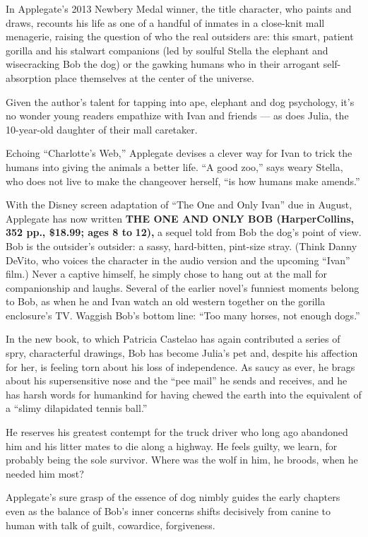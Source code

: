 In Applegate's 2013 Newbery Medal winner, the title character, who
paints and draws, recounts his life as one of a handful of inmates in a
close-knit mall menagerie, raising the question of who the real
outsiders are: this smart, patient gorilla and his stalwart companions
(led by soulful Stella the elephant and wisecracking Bob the dog) or the
gawking humans who in their arrogant self-absorption place themselves at
the center of the universe.

Given the author's talent for tapping into ape, elephant and dog
psychology, it's no wonder young readers empathize with Ivan and friends
--- as does Julia, the 10-year-old daughter of their mall caretaker.

Echoing ``Charlotte's Web,'' Applegate devises a clever way for Ivan to
trick the humans into giving the animals a better life. ``A good zoo,''
says weary Stella, who does not live to make the changeover herself,
``is how humans make amends.''

With the Disney screen adaptation of ``The One and Only Ivan'' due in
August, Applegate has now written \textbf{THE ONE AND ONLY BOB
(HarperCollins, 352 pp., \$18.99; ages 8 to} \textbf{12),} a sequel told
from Bob the dog's point of view. Bob is the outsider's outsider: a
sassy, hard-bitten, pint-size stray. (Think Danny DeVito, who voices the
character in the audio version and the upcoming ``Ivan'' film.) Never a
captive himself, he simply chose to hang out at the mall for
companionship and laughs. Several of the earlier novel's funniest
moments belong to Bob, as when he and Ivan watch an old western together
on the gorilla enclosure's TV. Waggish Bob's bottom line: ``Too many
horses, not enough dogs.''

In the new book, to which Patricia Castelao has again contributed a
series of spry, characterful drawings, Bob has become Julia's pet and,
despite his affection for her, is feeling torn about his loss of
independence. As saucy as ever, he brags about his supersensitive nose
and the ``pee mail'' he sends and receives, and he has harsh words for
humankind for having chewed the earth into the equivalent of a ``slimy
dilapidated tennis ball.''

He reserves his greatest contempt for the truck driver who long ago
abandoned him and his litter mates to die along a highway. He feels
guilty, we learn, for probably being the sole survivor. Where was the
wolf in him, he broods, when he needed him most?

Applegate's sure grasp of the essence of dog nimbly guides the early
chapters even as the balance of Bob's inner concerns shifts decisively
from canine to human with talk of guilt, cowardice, forgiveness.

